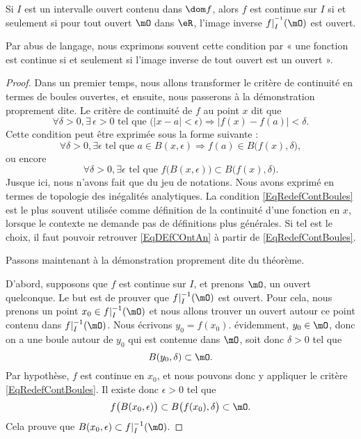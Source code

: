 \begin{theorem}     \label{ThoContInvOuvert}
Si $I$ est un intervalle ouvert contenu dans $\dom f$, alors $f$ est continue sur $I$ si et seulement si pour tout ouvert $\mO$ dans $\eR$, l'image inverse $f|_I^{^{-1}}(\mO)$ est ouvert.
\end{theorem}

Par abus de langage, nous exprimons souvent cette condition par « une fonction est continue si et seulement si l'image inverse de tout ouvert est un ouvert ».

\begin{proof}

Dans un premier temps, nous allons transformer le critère de continuité en termes de boules ouvertes, et ensuite, nous passerons à la démonstration proprement dite. Le critère de continuité de $f$ au point $x$ dit que
\begin{equation}        \label{EqDEfCOntAn}
  \forall \delta>0,\exists\,\epsilon>0\text{ tel que }\big( | x-a |< \epsilon \big)\Rightarrow| f(x)-f(a) |<\delta.
\end{equation}
Cette condition peut être exprimée sous la forme suivante :
\[
  \forall \delta>0,\exists\epsilon\text{ tel que } a\in B(x,\epsilon)\Rightarrow f(a)\in B\big( f(x),\delta \big),
\]
ou encore
\begin{equation}        \label{EqRedefContBoules}
  \forall \delta>0,\exists\epsilon\text{ tel que } f\big( B(x,\epsilon) \big)\subset B\big( f(x),\delta \big).
\end{equation}
Jusque ici, nous n'avons fait que du jeu de notations. Nous avons exprimé en termes de topologie des inégalités analytiques. La condition \eqref{EqRedefContBoules} est le plus souvent utilisée comme définition de la continuité d'une fonction en \( x\), lorsque le contexte ne demande pas de définitions plus générales. Si tel est le choix, il faut pouvoir retrouver \eqref{EqDEfCOntAn} à partir de \eqref{EqRedefContBoules}.

Passons maintenant à la démonstration proprement dite du théorème.

D'abord, supposons que $f$ est continue sur $I$, et prenons $\mO$, un ouvert quelconque. Le but est de prouver que $f|_I^{-1}(\mO)$ est ouvert. Pour cela, nous prenons un point $x_0\in f|_I^{-1}(\mO)$ et nous allons trouver un ouvert autour ce point contenu dans $f|_I^{-1}(\mO)$. Nous écrivons $y_0=f(x_0)$. évidemment, $y_0\in\mO$, donc on a une boule autour de $y_0$ qui est contenue dans $\mO$, soit donc $\delta>0$ tel que
\[
  B(y_0,\delta)\subset\mO.
\]
Par hypothèse, $f$ est continue en $x_0$, et nous pouvons donc y appliquer le critère \eqref{EqRedefContBoules}. Il existe donc $\epsilon>0$ tel que
\[
  f\big( B(x_0,\epsilon) \big)\subset B\big( f(x_0),\delta \big)\subset\mO.
\]
Cela prouve que $B(x_0,\epsilon)\subset f|_I^{-1}(\mO)$.


\end{proof}
